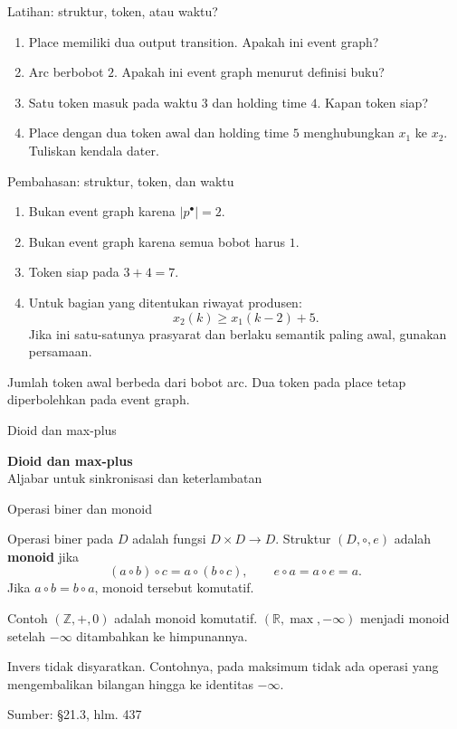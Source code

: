 \documentclass[aspectratio=169,11pt]{beamer}
\newcommand{\source}[1]{%
    \vfill
    \hfill{\tiny\color{gray}Sumber: #1}
}
\begin{document}
\begin{frame}{Latihan: struktur, token, atau waktu?}

\begin{enumerate}
\item Place memiliki dua output transition. Apakah ini event graph?
\item Arc berbobot $2$. Apakah ini event graph menurut definisi buku?
\item Satu token masuk pada waktu $3$ dan holding time $4$.
Kapan token siap?
\item Place dengan dua token awal dan holding time $5$
menghubungkan $x_1$ ke $x_2$. Tuliskan kendala dater.
\end{enumerate}

\end{frame}
\begin{frame}{Pembahasan: struktur, token, dan waktu}

\begin{enumerate}
\item Bukan event graph karena $|p^\bullet|=2$.
\item Bukan event graph karena semua bobot harus $1$.
\item Token siap pada $3+4=7$.
\item Untuk bagian yang ditentukan riwayat produsen:
\[
x_2(k)\ge x_1(k-2)+5.
\]
Jika ini satu-satunya prasyarat dan berlaku semantik paling awal,
gunakan persamaan.
\end{enumerate}
Jumlah token awal berbeda dari bobot arc.
Dua token pada place tetap diperbolehkan pada event graph.

\end{frame}
\begin{frame}{Dioid dan max-plus}
\begin{center}{\LARGE\bfseries\color{AcademicBlue}Dioid dan max-plus}\\[8mm]Aljabar untuk sinkronisasi dan keterlambatan\end{center}
\end{frame}
\begin{frame}{Operasi biner dan monoid}

Operasi biner pada $D$ adalah fungsi $D\times D\to D$.
Struktur $(D,\circ,e)$ adalah \textbf{monoid} jika
\[
(a\circ b)\circ c=a\circ(b\circ c),\qquad
e\circ a=a\circ e=a.
\]
Jika $a\circ b=b\circ a$, monoid tersebut komutatif.
\begin{exampleblock}{Contoh}
$(\mathbb Z,+,0)$ adalah monoid komutatif.
$(\mathbb R,\max,-\infty)$ menjadi monoid setelah $-\infty$ ditambahkan ke himpunannya.
\end{exampleblock}
Invers tidak disyaratkan. Contohnya, pada maksimum tidak ada operasi
yang mengembalikan bilangan hingga ke identitas $-\infty$.

\source{\S21.3, hlm. 437}
\end{frame}
\end{document}
